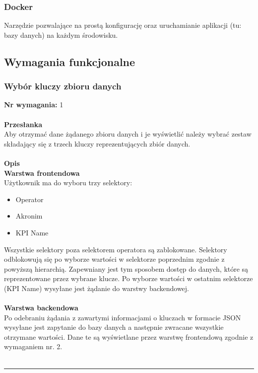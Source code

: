 \documentclass[eng,printmode]{mgr}
\begin{document}
\subsubsection{Docker}
Narzędzie pozwalające na prostą konfigurację oraz uruchamianie aplikacji (tu: bazy danych) na każdym środowisku.
\subsection{Wymagania funkcjonalne}
\subsubsection{Wybór kluczy zbioru danych}
\textbf{Nr wymagania:} 1 
\\\\
\textbf{Przesłanka}\\
Aby otrzymać dane żądanego zbioru danych i je wyświetlić należy wybrać zestaw składający się z trzech kluczy reprezentujących zbiór danych.
\\\\
\textbf{Opis}\\
\textbf{Warstwa frontendowa} \\
Użytkownik ma do wyboru trzy selektory:
\begin{itemize}
\item Operator
\item Akronim
\item KPI Name
\end{itemize}

Wszystkie selektory poza selektorem operatora są zablokowane. Selektory odblokowują się po wyborze wartości w selektorze poprzednim zgodnie z powyższą hierarchią. Zapewniany jest tym sposobem dostęp do danych, które są reprezentowane przez wybrane klucze. Po wyborze wartości w ostatnim selektorze (KPI Name) wysyłane jest żądanie do warstwy backendowej. 
\\\\
\textbf{Warstwa backendowa} \\
Po odebraniu żądania z zawartymi informacjami o kluczach w formacie JSON wysyłane jest zapytanie do bazy danych a następnie zwracane wszystkie otrzymane wartości. Dane te są wyświetlane przez warstwę frontendową zgodnie z wymaganiem nr. 2.
\\\\\noindent\rule{\textwidth}{2pt}
\end{document}
